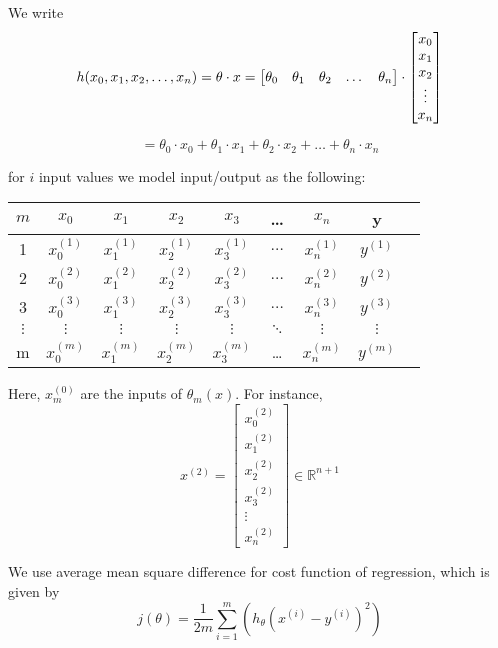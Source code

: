 We write
$$h(x_0, x_1, x_2, \dots, x_n) = \theta \cdot x \\
= 
\begin{bmatrix}
\theta_0 & \theta_1 & \theta_2 & \dots & \theta_n 
\end{bmatrix}
\cdot
\begin{bmatrix}
x_0 \\
x_1 \\
x_2 \\
\vdots\\
x_n
\end{bmatrix} 
$$

$$= \theta_0 \cdot x_0 + \theta_1 \cdot x_1 + \theta_2 \cdot x_2 + \dots + \theta_n \cdot x_n$$

for $i$ input values we model input/output as the following:
\begin{center}
\begin{tabular}{ |c|c|c|c|c|c|c|c|c| } 
\hline
$m$ & $x_0$ & $x_1$ & $x_2$ & $x_3$ & \dots & $x_n$ & y \\
\hline
1 & $x_0^{(1)}$ & $x_1^{(1)}$ & $x_2^{(1)}$ & $x_3^{(1)}$ & $\dots$ & $x_n^{(1)}$ & $y^{(1)}$\\ 
2 & $x_0^{(2)}$ & $x_1^{(2)}$ & $x_2^{(2)}$ & $x_3^{(2)}$ & $\dots$ & $x_n^{(2)}$ & $y^{(2)}$\\ 
3 & $x_0^{(3)}$ & $x_1^{(3)}$ & $x_2^{(3)}$ & $x_3^{(3)}$ & $\dots$ & $x_n^{(3)}$ & $y^{(3)}$\\ 
$\vdots$ & $\vdots$ & $\vdots$ & $\vdots$ & $\vdots$ & $\ddots$ & $\vdots$ & $\vdots$\\ 
m & $x_0^{(m)}$ & $x_1^{(m)}$ & $x_2^{(m)}$ & $x_3^{(m)}$ & \dots & $x_n^{(m)}$ & $y^{(m)}$\\ 
\hline
\end{tabular}
\end{center} 

Here, $x^{(0)}_m$ are the inputs of $\theta_m(x)$. For instance, 
$$x^{(2)} =  
\begin{bmatrix}
x_0^{(2)} \\
x_1^{(2)} \\
x_2^{(2)} \\
x_3^{(2)} \\
\vdots \\
x_n^{(2)}
\end{bmatrix}
\in \mathbb{R}^{n+1}
$$

We use average mean square difference for cost function of regression, which is given by
$$j(\theta) = \frac{1}{2m} \sum_{i=1}^{m} (h_{\theta}(x^{(i)} - y^{(i)})^{2})$$


